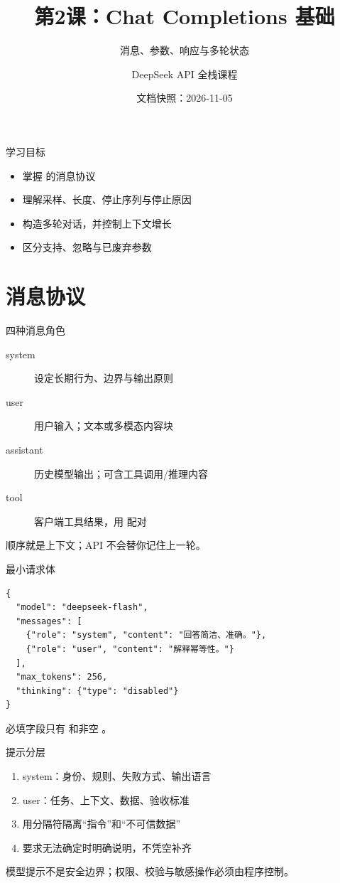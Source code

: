 \documentclass[aspectratio=169,UTF8]{ctexbeamer}
\title{第2课：Chat Completions 基础}
\subtitle{消息、参数、响应与多轮状态}
\author{DeepSeek API 全栈课程}
\date{文档快照：2026-11-05}
\begin{document}
\frame{\titlepage}
\begin{frame}{学习目标}
\begin{itemize}
  \item 掌握  的消息协议
  \item 理解采样、长度、停止序列与停止原因
  \item 构造多轮对话，并控制上下文增长
  \item 区分支持、忽略与已废弃参数
\end{itemize}
\end{frame}
\section{消息协议}
\begin{frame}{四种消息角色}
\begin{description}
  \item[system] 设定长期行为、边界与输出原则
  \item[user] 用户输入；文本或多模态内容块
  \item[assistant] 历史模型输出；可含工具调用/推理内容
  \item[tool] 客户端工具结果，用  配对
\end{description}
顺序就是上下文；API 不会替你记住上一轮。
\end{frame}
\begin{frame}[fragile]{最小请求体}
\begin{lstlisting}
{
  "model": "deepseek-flash",
  "messages": [
    {"role": "system", "content": "回答简洁、准确。"},
    {"role": "user", "content": "解释幂等性。"}
  ],
  "max_tokens": 256,
  "thinking": {"type": "disabled"}
}
\end{lstlisting}
必填字段只有  和非空 。
\end{frame}
\begin{frame}{提示分层}
\begin{enumerate}
  \item system：身份、规则、失败方式、输出语言
  \item user：任务、上下文、数据、验收标准
  \item 用分隔符隔离“指令”和“不可信数据”
  \item 要求无法确定时明确说明，不凭空补齐
\end{enumerate}
模型提示不是安全边界；权限、校验与敏感操作必须由程序控制。
\end{frame}
\end{document}
